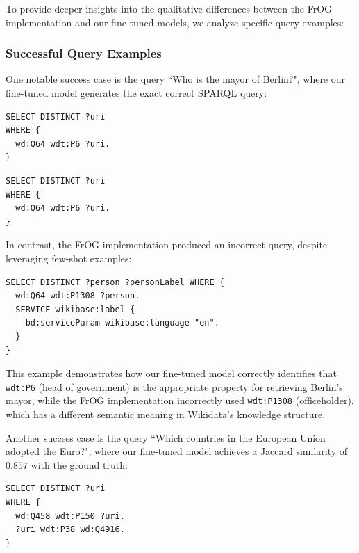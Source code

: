To provide deeper insights into the qualitative differences between the FrOG implementation and our fine-tuned models, we analyze specific query examples:

\subsubsection{Successful Query Examples}
One notable success case is the query ``Who is the mayor of Berlin?", where our fine-tuned model generates the exact correct SPARQL query:

\begin{lstlisting}[language=SPARQL, caption=Ground Truth Query for "Who is the mayor of Berlin?", label=code:berlin-mayor-true]
SELECT DISTINCT ?uri
WHERE {
  wd:Q64 wdt:P6 ?uri.
}
\end{lstlisting}

\begin{lstlisting}[language=SPARQL, caption=Our Fine-tuned Model Output for "Who is the mayor of Berlin?", label=code:berlin-mayor-finetuned]
SELECT DISTINCT ?uri
WHERE {
  wd:Q64 wdt:P6 ?uri.
}
\end{lstlisting}

In contrast, the FrOG implementation produced an incorrect query, despite leveraging few-shot examples:

\begin{lstlisting}[language=SPARQL, caption=FrOG Output for "Who is the mayor of Berlin?", label=code:berlin-mayor-previous]
SELECT DISTINCT ?person ?personLabel WHERE { 
  wd:Q64 wdt:P1308 ?person. 
  SERVICE wikibase:label { 
    bd:serviceParam wikibase:language "en". 
  } 
}
\end{lstlisting}

This example demonstrates how our fine-tuned model correctly identifies that \texttt{wdt:P6} (head of government) is the appropriate property for retrieving Berlin's mayor, while the FrOG implementation incorrectly used \texttt{wdt:P1308} (officeholder), which has a different semantic meaning in Wikidata's knowledge structure.

Another success case is the query ``Which countries in the European Union adopted the Euro?", where our fine-tuned model achieves a Jaccard similarity of $0.857$ with the ground truth:

\begin{lstlisting}[language=SPARQL, caption=Ground Truth Query for EU Countries with Euro, label=code:eu-euro-true]
SELECT DISTINCT ?uri
WHERE {
  wd:Q458 wdt:P150 ?uri.
  ?uri wdt:P38 wd:Q4916.
}
\end{lstlisting}

